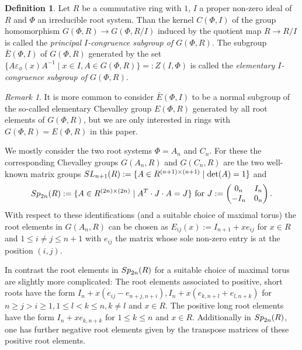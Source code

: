 \documentclass[12pt]{amsart}
\theoremstyle{definition}\newtheorem{definition}[theorem]{Definition}
\theoremstyle{remark}\newtheorem{remark}[theorem]{Remark}
\theoremstyle{definition}\newtheorem{case}{Case}
\begin{document}
\begin{definition}
Let $R$ be a commutative ring with $1$, $I$ a proper non-zero ideal of $R$ and $\Phi$ an irreducible root system. Than the kernel $C(\Phi,I)$ of the group homomorphism $G(\Phi,R)\to G(\Phi,R/I)$ induced by the quotient map $R\to R/I$ is called the \emph{principal $I$-congruence subgroup of $G(\Phi,R)$}. The subgroup $\bar{E}(\Phi,I)$ of $G(\Phi,R)$ generated by the set $\{A\varepsilon_{\phi}(x)A^{-1}\mid x\in I,A\in G(\Phi,R)\}=:Z(I,\Phi)$ is called the \emph{elementary $I$-congruence subgroup of $G(\Phi,R).$}
\end{definition}

\begin{remark}
It is more common to consider $\bar{E}(\Phi,I)$ to be a normal subgroup of the so-called elementary Chevalley group $E(\Phi,R)$ generated by all root elements of $G(\Phi,R)$, but we are only interested in rings with $G(\Phi,R)=E(\Phi,R)$ in this paper.
\end{remark}

We mostly consider the two root systems $\Phi=A_n$ and $C_n.$ For these the corresponding Chevalley groups $G(A_n,R)$ and $G(C_n,R)$ are the two well-known matrix groups ${\rm SL}_{n+1}(R):=\{A\in R^{(n+1)\times (n+1)}\mid \det(A)=1\}$ and 
\[
{\rm Sp}_{2n}(R):=\{A\in R^{(2n)\times(2n)}\mid A^T\cdot J\cdot A=J\}
\text{ for } 
J:=
\begin{pmatrix}
0_n & I_n\\
-I_n & 0_n
\end{pmatrix}.
\]
With respect to these identifications (and a suitable choice of maximal torus) the root elements in $G(A_n,R)$ can be chosen as $E_{ij}(x):=I_{n+1}+xe_{ij}$ for $x\in R$ and $1\leq i\neq j\leq n+1$ with $e_{ij}$ the matrix whose sole non-zero entry is at the position $(i,j).$ 

In contrast the root elements in ${\rm Sp}_{2n}(R)$ for a suitable choice of maximal torus are slightly more complicated: The root elements associated to positive, short roots have the form $I_n+x(e_{ij}-e_{n+j,n+i}),I_n+x(e_{k,n+l}+e_{l,n+k})$ for $n\geq j>i\geq 1,1\leq l<k\leq n,k\neq l$ and $x\in R.$ The positive long root elements have the form $I_n+xe_{k,n+k}$ for $1\leq k\leq n$ and $x\in R.$ Additionally in ${\rm Sp}_{2n}(R)$, one has further negative root elements given by the transpose matrices of these positive root elements.
\end{document}
